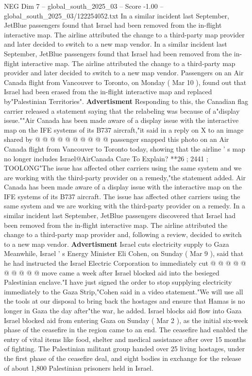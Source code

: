 \begin{textsample}{NEG Dim 7 – global\_south\_2025\_03 – Score -1.00 – global\_south\_2025\_03/122254052.txt}  \label{ex:f7_neg_024}
In a similar incident last September, JetBlue passengers found that Israel had been removed from the in-flight interactive map.
The airline attributed the change to a third-party map provider and later decided to switch to a new map vendor.
In a similar incident last September, JetBlue passengers found that Israel had been removed from the in-flight interactive map.
The airline attributed the change to a third-party map provider and later decided to switch to a new map vendor.
Passengers on an Air Canada flight from Vancouver to Toronto, on Monday ( Mar 10 ), found out that Israel had been erased from the in-flight interactive map and replaced by"Palestinian Territories". \textbf{Advertisment} Responding to this, the Canadian flag carrier released a statement saying that the relabeling was because of a"display issue.""Air Canada has been made aware of a display issue with the interactive map on the IFE systems of its B737 aircraft,"it said in a reply on X to an image shared by @ @ @ @ @ @ @ @ @ @ passenger snapped this photo on an Air Canada flight from Vancouver to Toronto today, showing that the airline ' s map no longer includes Israel@AirCanada Care To Explain? **26 ; 2441 ; TOOLONG"The issue has affected other carriers using the same system and we are working with the third-party provider on a remedy,"the statement added.
Air Canada has been made aware of a display issue with the interactive map on the IFE systems of its B737 aircraft.
The issue has affected other carriers using the same system and we are working with the third-party provider on a remedy.
In a similar incident last September, JetBlue passengers discovered that Israel had been removed from the in-flight interactive map.
The airline attributed the change to a third-party map provider and, following a review, decided to switch to a new map vendor. \textbf{Advertisment} Israel cuts electricity supply to Gaza Meanwhile, Israel ' s Energy Minister Eli Cohen, on Sunday ( Mar 9 ), said that he had instructed the Israel Electric Corporation to immediately cut @ @ @ @ @ @ @ @ @ @ move came a week after Israel blocked aid into the besieged Palestinian enclave."I have just signed the order to stop supplying electricity immediately to the Gaza Strip,"Cohen said in a video statement."We will use all the tools at our disposal to bring back the hostages and ensure that Hamas is no longer in Gaza the day after"the war, he added.
Israel blocks aid flow into Gaza Israel blocked aid from entering Gaza on Sunday ( Mar 2 ), as the initial six-week phase of the ceasefire in the region came to an end.
The ceasefire had enabled the entry of vital items like food, shelter and medical assistance after over 15 months of fighting.
The Palestinian militant group handed over 25 living hostages, under the first phase of the ceasefire deal, and eight bodies in exchange for the release of about 1,800 Palestinian prisoners held in Israel.

\end{textsample}
